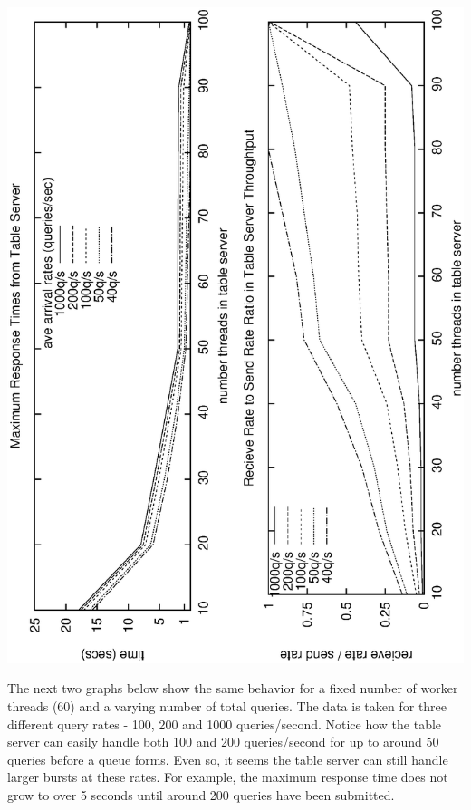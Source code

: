 \documentclass[11pt, a4paper]{article}
\begin{document}
\includegraphics[angle=-90,width=\linewidth]{tblperfthreads.eps}

The next two graphs below show the same behavior for a fixed number of worker threads (60) 
and a varying number of total queries.  The data is taken for three different 
query rates - 100, 200 and 1000 queries/second.   Notice how the table server can easily 
handle both 100 and 200 queries/second for up to around 50 queries before a queue forms.  
Even so,  it seems the table server can still handle larger bursts at these rates. 
For example, the maximum response time does not grow to over 5 seconds until around 200 queries 
have been submitted.
\end{document}
